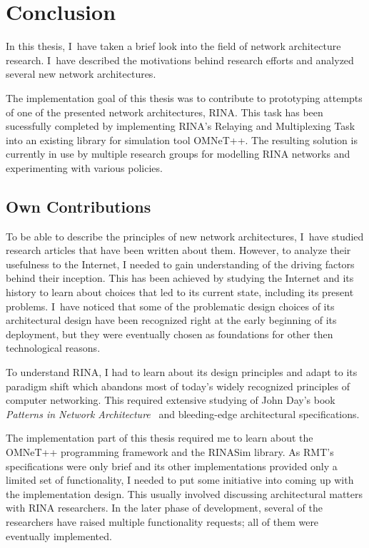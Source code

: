 \chapter{Conclusion}\label{conclusion}

    In this thesis, I~have taken a brief look into the field of network architecture research. I~have described the motivations behind research efforts and analyzed several new network architectures.

    The implementation goal of this thesis was to contribute to prototyping attempts of one of the presented network architectures, RINA. This task has been sucessfully completed by implementing RINA's Relaying and Multiplexing Task into an existing library for simulation tool OMNeT++. The resulting solution is currently in use by multiple research groups for modelling RINA networks and experimenting with various policies.

    \section{Own Contributions}

    To be able to describe the principles of new network architectures, I~have studied research articles that have been written about them. However, to analyze their usefulness to the Internet, I needed to gain understanding of the driving factors behind their inception. This has been achieved by studying the Internet and its history to learn about choices that led to its current state, including its present problems. I~have noticed that some of the problematic design choices of its architectural design have been recognized right at the early beginning of its deployment, but they were eventually chosen as foundations for other then technological reasons.

    To understand RINA, I had to learn about its design principles and adapt to its paradigm shift which abandons most of today's widely recognized principles of computer networking. This required extensive studying of John Day's book \emph{Patterns in Network Architecture}~\cite{Patterns} and bleeding-edge architectural specifications.

    The implementation part of this thesis required me to learn about the OMNeT++ programming framework and the RINASim library. As RMT's specifications were only brief and its other implementations provided only a limited set of functionality, I needed to put some initiative into coming up with the implementation design. This usually involved discussing architectural matters with RINA researchers. In the later phase of development, several of the researchers have raised multiple functionality requests; all of them were eventually implemented.


